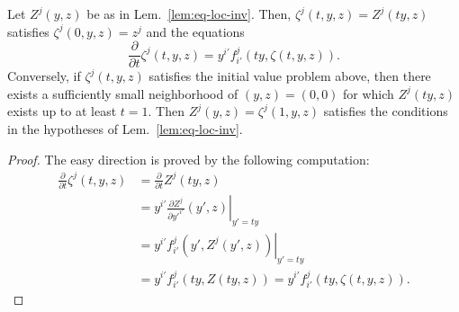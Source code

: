 \begin{lemma} \label{lem:eq-radial}
Let $Z^j(y,z)$ be as in Lem.~\ref{lem:eq-loc-inv}. Then, $\zeta^j(t,y,z) =
Z^j(ty,z)$ satisfies $\zeta^j(0,y,z) = z^j$ and the equations
\[
  \frac{\partial}{\partial t} \zeta^j(t,y,z) = y^{i'} f_{i'}^j(ty,\zeta(t,y,z)) .
\]
Conversely, if $\zeta^j(t,y,z)$ satisfies the initial value problem above, then
there exists a sufficiently small neighborhood of $(y,z)=(0,0)$ for which
$Z^j(ty,z)$ exists up to at least $t=1$. Then $Z^j(y,z) = \zeta^j(1,y,z)$
satisfies the conditions in the hypotheses of Lem.~\ref{lem:eq-loc-inv}.
\end{lemma}
\begin{proof}
The easy direction is proved by the following computation:
\begin{align*}
  \frac{\partial}{\partial t} \zeta^j(t,y,z)
  &= \frac{\partial}{\partial t} Z^j(ty,z)
  \\
  &= y^{i'} \left.\frac{\partial Z^j}{\partial y'^{i'}}(y',z) \right|_{y'=ty}
  \\
  &= y^{i'} \left.f_{i'}^j(y',Z^j(y',z)) \right|_{y'=ty}
  \\
  &= y^{i'} f_{i'}^j(ty,Z(ty,z))
  = y^{i'} f_{i'}^j(ty, \zeta(t,y,z)) .
\end{align*}


\end{proof}
